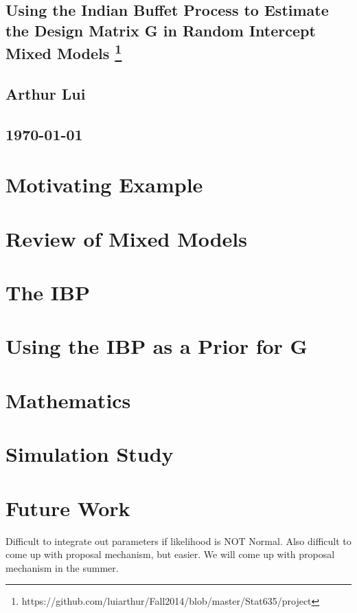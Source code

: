 \documentclass{article}
\begin{document}
\begin{center}
  \section*{\textbf{Using the Indian Buffet Process to Estimate the Design Matrix G in Random Intercept Mixed Models}
    \footnote{https://github.com/luiarthur/Fall2014/blob/master/Stat635/project}
  }
  \subsection*{\textbf{Arthur Lui}}
  \subsection*{\noindent\today}
\end{center}

\section*{Motivating Example}
\section*{Review of Mixed Models}
\section*{The IBP}
\section*{Using the IBP as a Prior for G}
\section*{Mathematics}
\section*{Simulation Study}
\section*{Future Work}
Difficult to integrate out parameters if likelihood is NOT Normal.
Also difficult to come up with proposal mechanism, but easier. 
We will come up with proposal mechanism in the summer.
\end{document}
